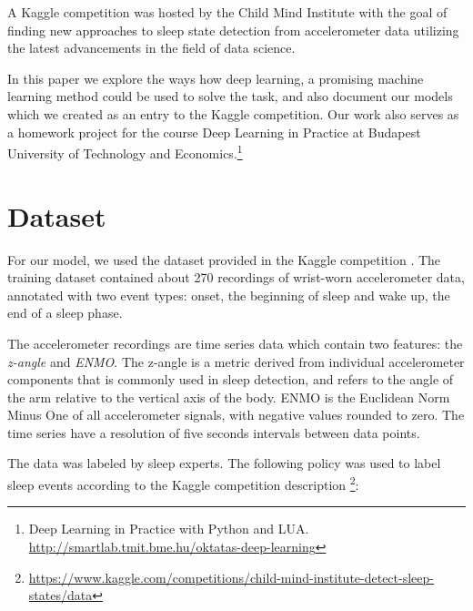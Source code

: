 \documentclass{article}
\begin{document}
A Kaggle competition was hosted by the Child Mind Institute \cite{child-mind-institute-detect-sleep-states} with the goal of finding new approaches to sleep state detection from accelerometer data utilizing the latest advancements in the field of data science.

In this paper we explore the ways how deep learning, a promising machine learning method could be used to solve the task, and also document our models which we created as an entry to the Kaggle competition. Our work also serves as a homework project for the course Deep Learning in Practice at Budapest University of Technology and Economics.\footnote{Deep Learning in Practice with Python and LUA. \url{http://smartlab.tmit.bme.hu/oktatas-deep-learning}}


\section{Dataset}
\label{dataset}

For our model, we used the dataset provided in the Kaggle competition \cite{child-mind-institute-detect-sleep-states}. The training dataset contained about 270 recordings of wrist-worn accelerometer data, annotated with two event types: onset, the beginning of sleep and wake up, the end of a sleep phase. 

The accelerometer recordings are time series data which contain two features: the \textit{z-angle} and \textit{ENMO}. The z-angle is a metric derived from individual accelerometer components that is commonly used in sleep detection, and refers to the angle of the arm relative to the vertical axis of the body. ENMO is the Euclidean Norm Minus One of all accelerometer signals, with negative values rounded to zero. The time series have a resolution of five seconds intervals between data points.

The data was labeled by sleep experts. The following policy was used to label sleep events according to the Kaggle competition description \footnote{\url{https://www.kaggle.com/competitions/child-mind-institute-detect-sleep-states/data}}:
\end{document}
